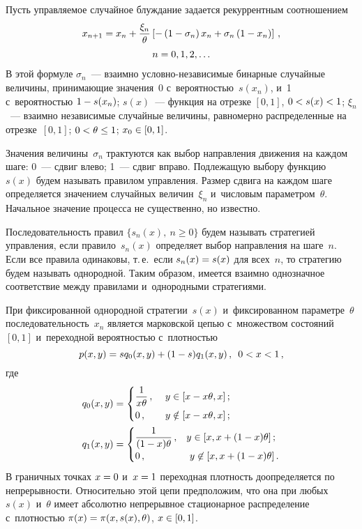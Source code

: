 \begin{multicols}{2}
  Пусть управляемое случайное блуж\-да\-ние задается рекуррентным 
соотношением
  \begin{multline*}
  x_{n+1}=x_n+\displaystyle\frac{\displaystyle \xi_n\mathstrut}{\displaystyle \theta\mathstrut}\left[ -\left( 1-\sigma_n\right) x_n +\sigma_n 
\left( 1-x_n\right)\right]\,,\\
  n=0,1,2,\ldots
\end{multline*}
    В этой формуле $\sigma_n$~--- взаимно услов\-но-не\-за\-ви\-си\-мые 
бинарные случайные величины, принима\-ющие значения~0 
с~вероятностью~$s(x_n)$, и~1 с~вероятностью $1\hm- s(x_n)$; $s(x)$~--- 
функция на отрезке $[0,1]$, $0\hm< s(x)\hm<1$; $\xi_n$~---  взаимно 
независимые случайные величины, равномерно распределенные на 
отрезке~$[0, 1]$; $0\hm< \theta\hm\leq 1$; $x_0\hm\in 
[0,1]$.
  
  Значения величины~$\sigma_n$ трактуются как выбор на\-прав\-ле\-ния 
движения на каждом шаге: 0~--- сдвиг влево; 1~--- сдвиг вправо. 
Подлежащую выбору функцию~$s(x)$ будем называть правилом управ\-ле\-ния. 
Размер сдвига на каждом шаге определяется значением случайных 
величин~$\xi_n$ и~чис\-ло\-вым па\-ра\-мет\-ром~$\theta$. Начальное значение 
процесса не существенно, но известно.
  
  Последовательность правил $\{ s_n(x),\ n\geq 0\}$ будем называть 
стратегией управ\-ле\-ния, если правило~$s_n(x)$ определяет выбор 
направления на шаге~$n$. Если все правила одинаковы, т.\,е.\ если 
$s_n(x)\hm= s(x)$ для всех~$n$, то стратегию будем называть однородной. 
Таким образом, имеется взаимно однозначное соответствие меж\-ду 
правилами и~однородными стратегиями.
  
  При фиксированной однородной стратегии~$s(x)$ и~фиксированном 
па\-ра\-мет\-ре~$\theta$ по\-сле\-до\-ва\-тель\-ность~$x_n$ является марковской цепью 
с~множеством со\-сто\-яний~$[0,1]$ и~переходной ве\-ро\-ят\-ностью с~плот\-ностью
  \begin{equation}
  p(x,y) =sq_0(x,y)+(1-s)q_1(x,y)\,,\enskip 0<x<1\,,
  \label{e1-kr}
  \end{equation}
где
\begin{align*}
q_0(x,y) &= \begin{cases}
\displaystyle\frac{\displaystyle 1\mathstrut}{\displaystyle x\theta\mathstrut}\,, &\ y\in [x-x\theta, x]\,;\\
0\,, &\  y\notin [x-x\theta,x]\,;
\end{cases}\\
q_1(x,y)&= \begin{cases}
\displaystyle\frac{\displaystyle 1\mathstrut}{\displaystyle (1-x)\theta\mathstrut}\,, & y\in [x,x+(1-x)\theta]\,;\\
0\,, &\ y\not\in [x, x+(1-x)\theta]\,.
\end{cases}
\end{align*}
В граничных точках $x\hm=0$ и~$x\hm=1$ переходная плот\-ность 
доопределяется по не\-пре\-рыв\-ности. Относительно этой цепи предположим, 
что она при любых~$s(x)$ и~$\theta$ имеет абсолютно непрерывное 
стационарное распределение с~плот\-ностью $\pi(x)\hm= \pi(x,s(x),\theta)$, 
$x\hm\in [0,1]$.


\end{multicols}
